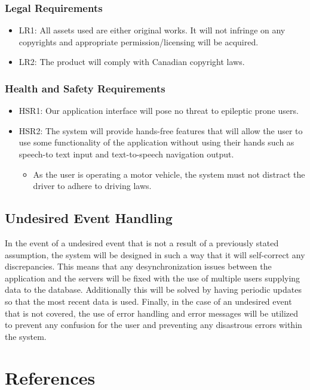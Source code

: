 \documentclass[]{article}
\begin{document}
\subsubsection{Legal Requirements}
\begin{itemize}
	\item LR1: All assets used are either original works. It will not infringe on any copyrights and appropriate permission/licensing will be acquired.
	\item LR2: The product will comply with Canadian copyright laws.
\end{itemize}

\subsubsection{Health and Safety Requirements}
\begin{itemize}
	\item HSR1: Our application interface will pose no threat to epileptic prone users.
	
	\item HSR2: The system will provide hands-free features that will allow the user to use some functionality of the application without using their hands such as speech-to text input and text-to-speech navigation output.
	\begin{itemize}
		\item As the user is operating a motor vehicle, the system must not distract the driver to adhere to driving laws.
	\end{itemize}
\end{itemize}

\subsection{Undesired Event Handling}
In the event of a undesired event that is not a result of a previously stated assumption, the system will be designed in such a way that it will self-correct any discrepancies. This means that any desynchronization issues between the application and the servers will be fixed with the use of multiple users supplying data to the database. Additionally this will be solved by having periodic updates so that the most recent data is used. Finally, in the case of an undesired event that is not covered, the use of error handling and error messages will be utilized to prevent any confusion for the user and preventing any disastrous errors within the system. 
\section{References}
\end{document}
